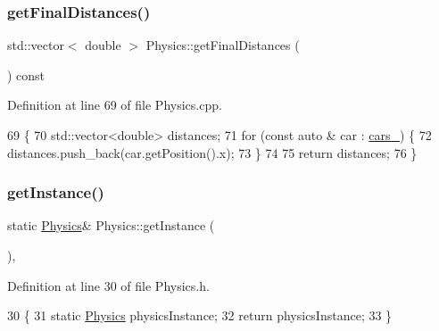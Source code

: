 \subsubsection{\texorpdfstring{get\+Final\+Distances()}{getFinalDistances()}}
{\footnotesize\ttfamily std\+::vector$<$ double $>$ Physics\+::get\+Final\+Distances (\begin{DoxyParamCaption}{ }\end{DoxyParamCaption}) const}



Definition at line 69 of file Physics.\+cpp.


\begin{DoxyCode}
69                                                    \{
70     std::vector<double> distances;
71     \textcolor{keywordflow}{for} (\textcolor{keyword}{const} \textcolor{keyword}{auto} & car : \hyperlink{classPhysics_ad798f52a18a2e5975f349b1fd95ceefc}{cars\_}) \{
72         distances.push\_back(car.getPosition().x);
73     \}
74 
75     \textcolor{keywordflow}{return} distances;
76 \}
\end{DoxyCode}
\mbox{\label{classPhysics_ab0590d6f12821b4e4a3ef894663704a1}} 
\subsubsection{\texorpdfstring{get\+Instance()}{getInstance()}}
{\footnotesize\ttfamily static \hyperlink{classPhysics}{Physics}\& Physics\+::get\+Instance (\begin{DoxyParamCaption}{ }\end{DoxyParamCaption})\hspace{0.3cm}{\ttfamily [inline]}, {\ttfamily [static]}}



Definition at line 30 of file Physics.\+h.


\begin{DoxyCode}
30                                   \{
31         \textcolor{keyword}{static} \hyperlink{classPhysics}{Physics} physicsInstance;
32         \textcolor{keywordflow}{return} physicsInstance;
33     \}
\end{DoxyCode}
\mbox{\label{classPhysics_ad18d164ad1e718a207e5d5d16bff9f0c}} 
